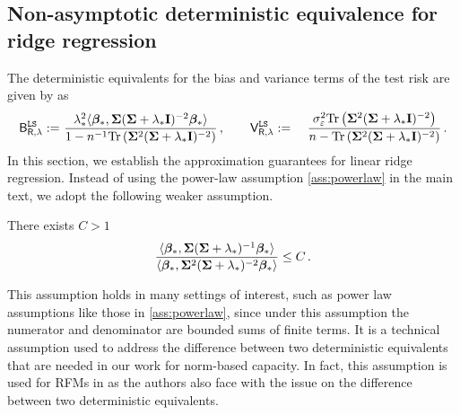 \subsection{Non-asymptotic deterministic equivalence for ridge regression}
\label{app:nonasy_deter_equiv_lr}

The deterministic equivalents for the bias and variance terms of the test risk are given by \citet{misiakiewicz2024non} as 
\[
\begin{aligned}
\mathsf B_{\mathsf R,\lambda}^{\tt LS} :=&~ \frac{\lambda_*^2 \langle {\boldsymbol \beta}_*, {\boldsymbol \Sigma}({\boldsymbol \Sigma} + \lambda_*{\mathbf I})^{-2} {\boldsymbol \beta}_* \rangle}{1 - n^{-1} {\rm Tr}\left({\boldsymbol \Sigma}^2 ({\boldsymbol \Sigma} + \lambda_*{\mathbf I})^{-2}\right)}\,, \qquad \mathsf V_{\mathsf R,\lambda}^{\tt LS} :=&~ \frac{\sigma_{\varepsilon}^2 {\rm Tr}\left({\boldsymbol \Sigma}^2 ({\boldsymbol \Sigma} + \lambda_*{\mathbf I})^{-2}\right)}{n - {\rm Tr}\left({\boldsymbol \Sigma}^2 ({\boldsymbol \Sigma} + \lambda_*{\mathbf I})^{-2}\right)}\,.
\end{aligned}
\]
In this section, we establish the approximation guarantees for linear ridge regression.
Instead of using the power-law assumption \cref{ass:powerlaw} in the main text, we adopt the following weaker assumption.
\begin{assumption}\label{ass:technical_LR} There exists $C>1$
\[
    \frac{\langle {\boldsymbol \beta}_*, {\boldsymbol \Sigma}({\boldsymbol \Sigma}+\lambda_*)^{-1}{\boldsymbol \beta}_* \rangle}{\langle {\boldsymbol \beta}_*, {\boldsymbol \Sigma}^2({\boldsymbol \Sigma}+\lambda_*)^{-2}{\boldsymbol \beta}_* \rangle} \leq C\,.
\]
\end{assumption}
This assumption holds in many settings of interest, such as power law assumptions like those in \cref{ass:powerlaw}, since under this assumption the numerator and denominator are bounded sums of finite terms. It is a technical assumption used to address the difference between two deterministic equivalents that are needed in our work for norm-based capacity.
In fact, this assumption is used for RFMs in \cite{defilippis2024dimension} as the authors also face with the issue on the difference between two deterministic equivalents.


